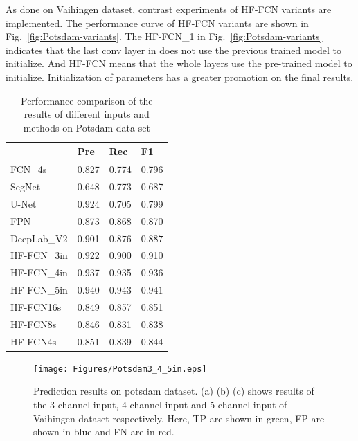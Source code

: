  As done on Vaihingen dataset, contrast experiments of HF-FCN variants are implemented. The performance curve of HF-FCN variants are shown in Fig.~\ref{fig:Potsdam-variants}.
 The HF-FCN\_1 in Fig.~\ref{fig:Potsdam-variants} indicates that the last conv layer in  does not use the previous trained model to initialize. And HF-FCN means that the whole layers use the pre-trained model to initialize. Initialization of parameters has a greater promotion on the final results.

\begin{table}[htbp]
\vspace{-0.2cm}
\caption {Performance comparison of the results of different inputs and methods on Potsdam data set}
\label{table:Potsdam-3-4-5in-comp}
\centering
\begin{tabular}{p{2.5cm}<{\centering}|p{1.1cm}<{\centering}|p{1.1cm}<{\centering}|p{1.1cm}<{\centering}}
\hline
&Pre&Rec&F1\\
\hline
FCN\_4s\cite{IEEEexample:Long_2015_CVPR}&{0.827}&{0.774}&{0.796}\\
SegNet\cite{IEEEexample:badrinarayanan2017segnet}&{0.648}&{0.773}&{0.687}\\
U-Net\cite{IEEEexample:ronneberger2015u}&$\bm{0.924}$&{0.705}&{0.799}\\
FPN\cite{IEEEexample:lin2017feature}&{0.873}&{0.868}&{0.870}\\
DeepLab\_V2\cite{IEEEexample:chen2016deeplab}&{0.901}&$\bm{0.876}$&$\bm{0.887}$\\
\hline \hline
HF-FCN\_3in&0.922&0.900&0.910\\
HF-FCN\_4in&0.937&0.935&0.936\\
HF-FCN\_5in&$\bm{0.940}$&$\bm{0.943}$&$\bm{0.941}$\\
HF-FCN16s&{0.849}&{0.857}&{0.851}\\
HF-FCN8s&{0.846}&{0.831}&{0.838}\\
HF-FCN4s&{0.851}&{0.839}&{0.844}\\
\hline
\end{tabular}
\end{table}

\begin{figure}
\vspace{-0cm}
\setlength{\abovecaptionskip}{-0cm}
\setlength{\belowcaptionskip}{-2cm}
\centering
\texttt{[image: Figures/Potsdam3\_4\_5in.eps]}
\caption{Prediction results on potsdam dataset. (a) (b) (c) shows results of the 3-channel input, 4-channel input and 5-channel input of Vaihingen dataset respectively. Here, TP are shown in green, FP are shown in blue and FN are in red.}
\label{fig:Potsdam-3-4-5in-visi}
\end{figure}

